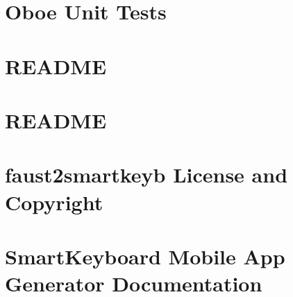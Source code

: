 \let\mypdfximage\pdfximage\def\pdfximage{\immediate\mypdfximage}\documentclass[twoside]{book}
\newcommand{\+}{\discretionary{\mbox{\scriptsize$\hookleftarrow$}}{}{}}
\begin{document}
\chapter{Oboe Unit Tests}
\label{md__c_1__users_fab_src__github_branches__neural_amp_modeler_plugin_i_plug2__dependencies__build_ead9722cb175d4272a242dbba8c9e265}

\chapter{R\+E\+A\+D\+ME}
\label{md__c_1__users_fab_src__github_branches__neural_amp_modeler_plugin_i_plug2__dependencies__build_ceee480a66019c40346f5a5ab6c54688}

\chapter{R\+E\+A\+D\+ME}
\label{md__c_1__users_fab_src__github_branches__neural_amp_modeler_plugin_i_plug2__dependencies__build_72aab2c7a97462acd3f23295f3904947}

\chapter{faust2smartkeyb License and Copyright}
\label{md__c_1__users_fab_src__github_branches__neural_amp_modeler_plugin_i_plug2__dependencies__build_500649fa0f78925dded24836390ec6e3}

\chapter{Smart\+Keyboard Mobile App Generator Documentation}
\label{md__c_1__users_fab_src__github_branches__neural_amp_modeler_plugin_i_plug2__dependencies__build_d208f9949a2ceccf359bbf9ea7e18f24}

\end{document}
